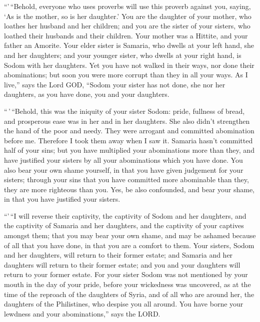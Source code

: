  ``'\,``Behold, everyone who uses proverbs will use this
proverb against you, saying, `As is the mother, so is her daughter.'
 You are the daughter of your mother, who loathes her
husband and her children; and you are the sister of your sisters, who
loathed their husbands and their children. Your mother was a Hittite,
and your father an Amorite.  Your elder sister is
Samaria, who dwells at your left hand, she and her daughters; and your
younger sister, who dwells at your right hand, is Sodom with her
daughters.  Yet you have not walked in their ways, nor
done their abominations; but soon you were more corrupt than they in all
your ways.  As I live,'' says the Lord GOD, ``Sodom your
sister has not done, she nor her daughters, as you have done, you and
your daughters.

 ``\,'\,``Behold, this was the iniquity of your sister
Sodom: pride, fullness of bread, and prosperous ease was in her and in
her daughters. She also didn't strengthen the hand of the poor and
needy.  They were arrogant and committed abomination
before me. Therefore I took them away when I saw it. 
Samaria hasn't committed half of your sins; but you have multiplied your
abominations more than they, and have justified your sisters by all your
abominations which you have done.  You also bear your own
shame yourself, in that you have given judgement for your sisters;
through your sins that you have committed more abominable than they,
they are more righteous than you. Yes, be also confounded, and bear your
shame, in that you have justified your sisters.

 ``'\,``I will reverse their captivity, the captivity of
Sodom and her daughters, and the captivity of Samaria and her daughters,
and the captivity of your captives amongst them;  that
you may bear your own shame, and may be ashamed because of all that you
have done, in that you are a comfort to them.  Your
sisters, Sodom and her daughters, will return to their former estate;
and Samaria and her daughters will return to their former estate; and
you and your daughters will return to your former estate.
 For your sister Sodom was not mentioned by your mouth in
the day of your pride,  before your wickedness was
uncovered, as at the time of the reproach of the daughters of Syria, and
of all who are around her, the daughters of the Philistines, who despise
you all around.  You have borne your lewdness and your
abominations,'' says the LORD.

